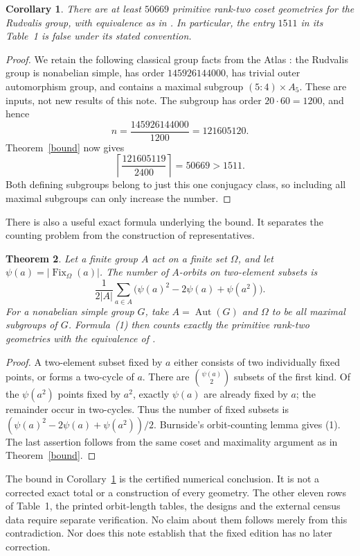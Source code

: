 \documentclass[11pt]{article}
\newtheorem{theorem}{Theorem}
\newtheorem{corollary}[theorem]{Corollary}
\newcommand{\Aut}{\operatorname{Aut}}
\begin{document}
\begin{corollary}\label{ru}
There are at least $50669$ primitive rank-two coset geometries for the
Rudvalis group, with equivalence as in \cite{LR}. In particular, the
entry $1511$ in its Table~1 is false under its stated convention.
\end{corollary}
\begin{proof}
We retain the following classical group facts from the Atlas
\cite{Atlas}: the Rudvalis group is nonabelian simple, has order
$145926144000$, has trivial outer automorphism group, and contains a
maximal subgroup $(5{:}4)\times A_5$. These are inputs, not new results
of this note. The subgroup has order $20\cdot60=1200$, and hence
\[
 n=\frac{145926144000}{1200}=121605120.
\]
Theorem~\ref{bound} now gives
\[
 \left\lceil\frac{121605119}{2400}\right\rceil=50669>1511.
\]
Both defining subgroups belong to just this one conjugacy class, so
including all maximal subgroups can only increase the number.
\end{proof}

There is also a useful exact formula underlying the bound. It separates
the counting problem from the construction of representatives.
\begin{theorem}\label{character}
Let a finite group $A$ act on a finite set $\Omega$, and let
$\psi(a)=|\operatorname{Fix}_{\Omega}(a)|$. The number of $A$-orbits
on two-element subsets is
\[
 \frac{1}{2|A|}\sum_{a\in A}
             \bigl(\psi(a)^2-2\psi(a)+\psi(a^2)\bigr).       \tag{1}
\]
For a nonabelian simple group $G$, take $A=\Aut(G)$ and $\Omega$ to
be all maximal subgroups of $G$. Formula~(1) then counts exactly the
primitive rank-two geometries with the equivalence of \cite{LR}.
\end{theorem}
\begin{proof}
A two-element subset fixed by $a$ either consists of two individually
fixed points, or forms a two-cycle of $a$. There are
$\binom{\psi(a)}2$ subsets of the first kind. Of the $\psi(a^2)$ points
fixed by $a^2$, exactly $\psi(a)$ are already fixed by $a$; the remainder
occur in two-cycles. Thus the number of fixed subsets is
$(\psi(a)^2-2\psi(a)+\psi(a^2))/2$. Burnside's orbit-counting lemma
gives (1). The last assertion follows from the same coset and maximality
argument as in Theorem~\ref{bound}.
\end{proof}

The bound in Corollary~\ref{ru} is the certified numerical conclusion.
It is not a corrected exact total or a construction of every geometry.
The other eleven rows of Table~1, the printed orbit-length tables,
the designs and the external census data require separate verification.
No claim about them follows merely from this contradiction. Nor does
this note establish that the fixed edition has no later correction.
\end{document}
